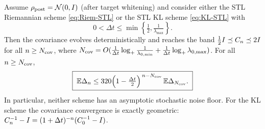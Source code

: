 \begin{theorem}
\label{thm:Gaussian-STL}
Assume $\rho_{\mathrm{post}}=\mathcal{N}(0,I)$ (after target whitening) and consider either the STL
Riemannian scheme \eqref{eq:Riem-STL} or the STL KL scheme \eqref{eq:KL-STL} with
\[
    0<\Delta t\leq\min\left\{\tfrac12,\tfrac1{\lambda_{\max}}\right\}.
\]
Then the covariance evolves deterministically and reaches the band
$\tfrac12I\preceq C_n\preceq2I$ for all $n\geq N_{\mathrm{cov}}$, where
$N_{\mathrm{cov}}=O(\tfrac1{\Delta t}\log_+\tfrac1{\lambda_{0,\min}}+\tfrac1{\Delta t}\log_+\lambda_{0,\max})$.
For all $n\geq N_{\mathrm{cov}}$,
\[
    \boxed{\;
    \mathbb{E}\Delta_n
    \leq
    320\Bigl(1-\tfrac{\Delta t}2\Bigr)^{\,n-N_{\mathrm{cov}}}\,\mathbb{E}\Delta_{N_{\mathrm{cov}}}.
    \;}
\]
In particular, neither scheme has an asymptotic stochastic noise floor. For the KL scheme
the covariance convergence is exactly geometric:
$C_n^{-1}-I=(1+\Delta t)^{-n}(C_0^{-1}-I)$.
\end{theorem}

